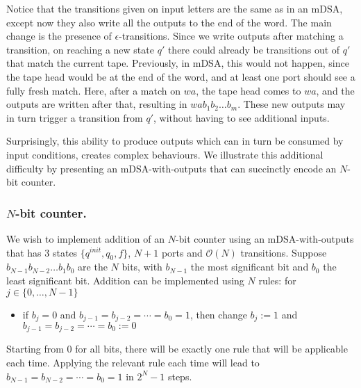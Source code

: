 Notice that the transitions given on input letters are the same as in an mDSA, except now they also write all the outputs to the end of the word. The main change is the presence of $\epsilon$-transitions. Since we write outputs after matching a transition, on reaching a new state $q'$ there could already be transitions out of $q'$ that match the current tape. Previously, in mDSA, this would not happen, since the tape head would be at the end of the word, and at least one port should see a fully fresh match. Here, after a match on $wa$, the tape head comes to $wa$, and the outputs are written after that, resulting in $wa b_1 b_2 \dots b_m$. These new outputs may in turn trigger a transition from $q'$, without having to see additional inputs.

Surprisingly, this ability to produce outputs which can in turn be consumed by input conditions, creates complex behaviours.  We illustrate this additional difficulty by presenting an mDSA-with-outputs that can succinctly encode an $N$-bit counter.

\subsubsection*{$N$-bit counter.} We wish to implement addition of an $N$-bit counter using an mDSA-with-outputs that has $3$ states $\{q^{init}, q_0, f\}$, $N+1$ ports and $\mathcal{O}(N)$ transitions. Suppose $b_{N-1} b_{N-2} \dots b_1 b_0$ are the $N$ bits, with $b_{N-1}$ the most significant bit and $b_0$ the least significant bit. Addition can be implemented using $N$ rules: for $j \in \{0, \dots, N-1\}$
\begin{itemize}
\item if $b_j = 0$ and $b_{j-1} = b_{j-2} = \cdots = b_0 = 1$, then change $b_j:= 1$ and $b_{j-1} = b_{j-2} = \cdots = b_0 := 0$
\end{itemize}
Starting from $0$ for all bits, there will be exactly one rule that will be applicable each time. Applying the relevant rule each time will lead to $b_{N-1} = b_{N-2} = \cdots = b_0 = 1$ in $2^N - 1$ steps.

